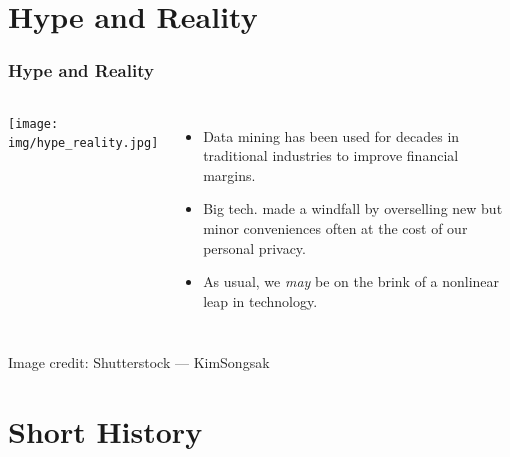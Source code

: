 \documentclass[11pt,
               aspectratio=169
               ]{beamer}
\begin{document}
	
	\section{Hype and Reality}
	
	
		\begin{frame}
		
			\frametitle{Hype and Reality}
	
			\begin{columns}
	
				\centering
				\texttt{[image: img/hype\_reality.jpg]}
	
				\vspace{-5pt}
				\begin{itemize}
					
					\item Data mining has been used for decades in traditional industries to improve financial margins.
					\item Big tech. made a windfall by overselling new but minor conveniences often at the cost of our personal privacy. 
					\item As usual, we \textit{may} be on the brink of a nonlinear leap in technology.
					
				\end{itemize}
				
	
			\end{columns}

			\vspace{10pt}

			\tiny Image credit: Shutterstock --- KimSongsak
			

		\end{frame}
		
	
	\section{Short History}
	
\end{document}
